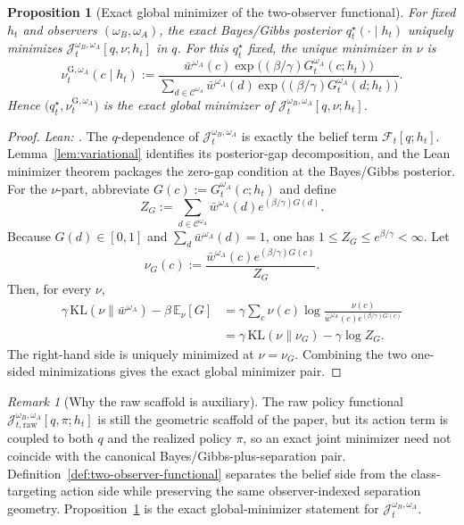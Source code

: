 \documentclass[11pt]{article}
\newtheorem{proposition}[theorem]{Proposition}
\theoremstyle{definition}
\theoremstyle{remark}
\newtheorem{remark}[theorem]{Remark}
\theoremstyle{plain}
\theoremstyle{definition}
\newcommand{\Ccal}{\mathcal{C}}
\newcommand{\E}{\mathbb{E}}
\newcommand{\KL}{\mathrm{KL}}
\begin{document}
\begin{proposition}[Exact global minimizer of the two-observer functional]
\label{prop:two-observer-minimizer}
For fixed $h_t$ and observers $(\omega_B,\omega_A)$, the exact Bayes/Gibbs posterior $q_t^\star(\cdot\mid h_t)$ uniquely minimizes $\mathcal J_t^{\omega_B,\omega_A}[q,\nu;h_t]$ in $q$. For this $q_t^\star$ fixed, the unique minimizer in $\nu$ is
\[
\nu_t^{\mathrm G,\omega_A}(c\mid h_t)
:=
\frac{\bar w^{\omega_A}(c)\exp\!\bigl((\beta/\gamma)G_t^{\omega_A}(c;h_t)\bigr)}
{\sum_{d\in\Ccal^{\omega_A}}\bar w^{\omega_A}(d)\exp\!\bigl((\beta/\gamma)G_t^{\omega_A}(d;h_t)\bigr)}.
\]
Hence $\bigl(q_t^\star,\nu_t^{\mathrm G,\omega_A}\bigr)$ is the exact global minimizer of $\mathcal J_t^{\omega_B,\omega_A}[q,\nu;h_t]$.
\end{proposition}

\begin{proof}
\noindent\emph{Lean: .}
The $q$-dependence of $\mathcal J_t^{\omega_B,\omega_A}$ is exactly the belief term $\mathcal F_t[q;h_t]$. Lemma~\ref{lem:variational} identifies its posterior-gap decomposition, and the Lean minimizer theorem packages the zero-gap condition at the Bayes/Gibbs posterior. For the $\nu$-part, abbreviate $G(c):=G_t^{\omega_A}(c;h_t)$ and define
\[
Z_G:=\sum_{d\in\Ccal^{\omega_A}}\bar w^{\omega_A}(d)e^{(\beta/\gamma)G(d)}.
\]
Because $G(d)\in[0,1]$ and $\sum_d\bar w^{\omega_A}(d)=1$, one has $1\le Z_G\le e^{\beta/\gamma}<\infty$. Let
\[
\nu_G(c):=\frac{\bar w^{\omega_A}(c)e^{(\beta/\gamma)G(c)}}{Z_G}.
\]
Then, for every $\nu$,
\begin{align*}
\gamma\,\KL(\nu\|\bar w^{\omega_A})-\beta\,\E_\nu[G]
&=\gamma\sum_c \nu(c)\log\frac{\nu(c)}{\bar w^{\omega_A}(c)e^{(\beta/\gamma)G(c)}}\\
&=\gamma\,\KL(\nu\|\nu_G)-\gamma\log Z_G.
\end{align*}
The right-hand side is uniquely minimized at $\nu=\nu_G$. Combining the two one-sided minimizations gives the exact global minimizer pair.
\end{proof}

\begin{remark}[Why the raw scaffold is auxiliary]
\label{rem:raw-scaffold-auxiliary}
The raw policy functional $\mathcal J_{t,\mathrm{raw}}^{\omega_B,\omega_A}[q,\pi;h_t]$ is still the geometric scaffold of the paper, but its action term is coupled to both $q$ and the realized policy $\pi$, so an exact joint minimizer need not coincide with the canonical Bayes/Gibbs-plus-separation pair. Definition~\ref{def:two-observer-functional} separates the belief side from the class-targeting action side while preserving the same observer-indexed separation geometry. Proposition~\ref{prop:two-observer-minimizer} is the exact global-minimizer statement for $\mathcal J_t^{\omega_B,\omega_A}$.
\end{remark}
\end{document}
